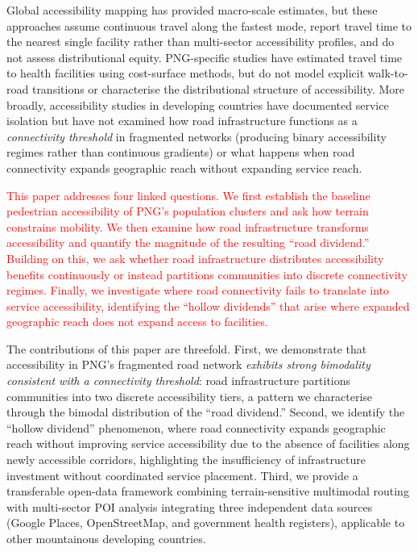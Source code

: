\documentclass[review,3p,authoryear]{elsarticle}
\newcommand{\rev}[1]{\textcolor{red}{#1}}
\begin{document}
Global accessibility mapping \citep{weiss2018, weiss2020, nelson2019} has provided macro-scale estimates, but these approaches assume continuous travel along the fastest mode, report travel time to the nearest single facility rather than multi-sector accessibility profiles, and do not assess distributional equity. PNG-specific studies \citep{ishida2022travel} have estimated travel time to health facilities using cost-surface methods, but do not model explicit walk-to-road transitions or characterise the distributional structure of accessibility. More broadly, accessibility studies in developing countries \citep{blanford2012, ouma2018} have documented service isolation but have not examined how road infrastructure functions as a \textit{connectivity threshold} in fragmented networks (producing binary accessibility regimes rather than continuous gradients) or what happens when road connectivity expands geographic reach without expanding service reach.

\rev{This paper addresses four linked questions. We first establish the baseline pedestrian accessibility of PNG's population clusters and ask how terrain constrains mobility. We then examine how road infrastructure transforms accessibility and quantify the magnitude of the resulting ``road dividend.'' Building on this, we ask whether road infrastructure distributes accessibility benefits continuously or instead partitions communities into discrete connectivity regimes. Finally, we investigate where road connectivity fails to translate into service accessibility, identifying the ``hollow dividends'' that arise where expanded geographic reach does not expand access to facilities.}

The contributions of this paper are threefold. First, we demonstrate that accessibility in PNG's fragmented road network \textit{exhibits strong bimodality consistent with a connectivity threshold}: road infrastructure partitions communities into two discrete accessibility tiers, a pattern we characterise through the bimodal distribution of the ``road dividend.'' Second, we identify the ``hollow dividend'' phenomenon, where road connectivity expands geographic reach without improving service accessibility due to the absence of facilities along newly accessible corridors, highlighting the insufficiency of infrastructure investment without coordinated service placement. Third, we provide a transferable open-data framework combining terrain-sensitive multimodal routing with multi-sector POI analysis integrating three independent data sources (Google Places, OpenStreetMap, and government health registers), applicable to other mountainous developing countries.
\end{document}
